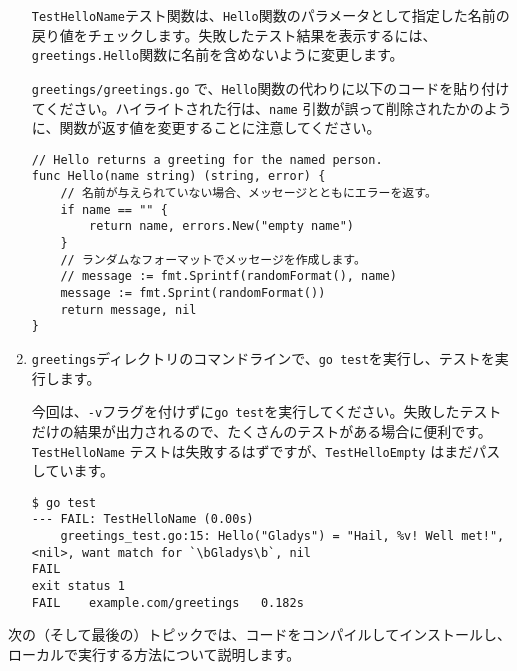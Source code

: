 \begin{enumerate}
\texttt{TestHelloName}テスト関数は、\texttt{Hello}関数のパラメータとして指定した名前の戻り値をチェックします。失敗したテスト結果を表示するには、\texttt{greetings.Hello}関数に名前を含めないように変更します。

\texttt{greetings/greetings.go} で、\texttt{Hello}関数の代わりに以下のコードを貼り付けてください。ハイライトされた行は、\texttt{name} 引数が誤って削除されたかのように、関数が返す値を変更することに注意してください。

\begin{lstlisting}[numbers=none]
// Hello returns a greeting for the named person.
func Hello(name string) (string, error) {
    // 名前が与えられていない場合、メッセージとともにエラーを返す。
    if name == "" {
        return name, errors.New("empty name")
    }
    // ランダムなフォーマットでメッセージを作成します。
    // message := fmt.Sprintf(randomFormat(), name)
    message := fmt.Sprint(randomFormat())
    return message, nil
}
\end{lstlisting}

\item \texttt{greetings}ディレクトリのコマンドラインで、\texttt{go test}を実行し、テストを実行します。

今回は、\texttt{-v}フラグを付けずに\texttt{go test}を実行してください。失敗したテストだけの結果が出力されるので、たくさんのテストがある場合に便利です。\texttt{TestHelloName} テストは失敗するはずですが、\texttt{TestHelloEmpty} はまだパスしています。

\begin{lstlisting}[numbers=none]
$ go test
--- FAIL: TestHelloName (0.00s)
    greetings_test.go:15: Hello("Gladys") = "Hail, %v! Well met!", <nil>, want match for `\bGladys\b`, nil
FAIL
exit status 1
FAIL    example.com/greetings   0.182s
\end{lstlisting}

\end{enumerate}


次の（そして最後の）トピックでは、コードをコンパイルしてインストールし、ローカルで実行する方法について説明します。



